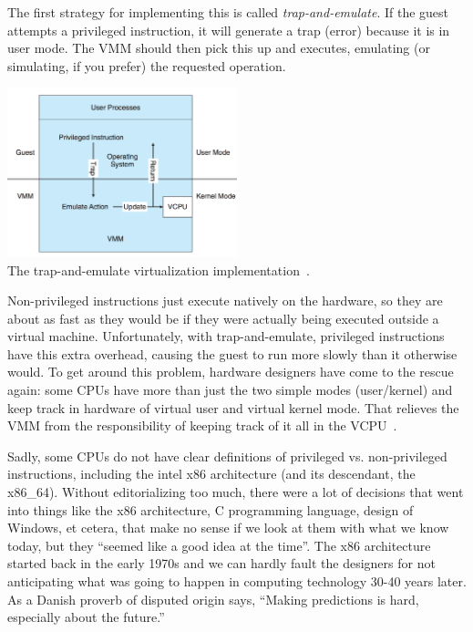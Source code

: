 The first strategy for implementing this is called \textit{trap-and-emulate}. If the guest attempts a privileged instruction, it will generate a trap (error) because it is in user mode. The VMM should then pick this up and executes, emulating (or simulating, if you prefer) the requested operation.

\begin{center}
	\includegraphics[width=0.5\textwidth]{images/trap-and-emulate.png}\\
	The trap-and-emulate virtualization implementation~\cite{osc}.
\end{center}

Non-privileged instructions just execute natively on the hardware, so they are about as fast as they would be if they were actually being executed outside a virtual machine. Unfortunately, with trap-and-emulate, privileged instructions have this extra overhead, causing the guest to run more slowly than it otherwise would. To get around this problem, hardware designers have come to the rescue again: some CPUs have more than just the two simple modes (user/kernel) and keep track in hardware of virtual user and virtual kernel mode. That relieves the VMM from the responsibility of keeping track of it all in the VCPU~\cite{osc}.

Sadly, some CPUs do not have clear definitions of privileged vs. non-privileged instructions, including the intel x86 architecture (and its descendant, the x86\_64). Without editorializing too much, there were a lot of decisions that went into things like the x86 architecture, C programming language, design of Windows, et cetera, that make no sense if we look at them with what we know today, but they ``seemed like a good idea at the time''. The x86 architecture started back in the early 1970s and we can hardly fault the designers for not anticipating what was going to happen in computing technology 30-40 years later. As a Danish proverb of disputed origin says, ``Making predictions is hard, especially about the future.''

